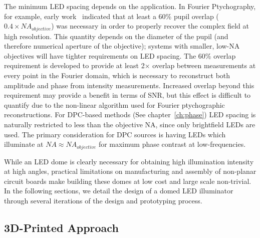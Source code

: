 The minimum LED spacing depends on the application. In Fourier Ptychography, for example, early work~\cite{Zheng2013, Tian14, Guo:15} indicated that at least a 60\% pupil overlap ($0.4 \times NA_{objective}$) was necessary in order to properly recover the complex field at high resolution. This quantity depends on the diameter of the pupil (and therefore numerical aperture of the objective); systems with smaller, low-NA objectives will have tighter requirements on LED spacing. The 60\% overlap requirement is developed to provide at least 2$\times$ overlap between measurements at every point in the Fourier domain, which is necessary to reconstruct both amplitude and phase from intensity measurements. Increased overlap beyond this requirement may provide a benefit in terms of SNR, but this effect is difficult to quantify due to the non-linear algorithm used for Fourier ptychographic reconstructions. For DPC-based methods (See chapter~\ref{ch:phase}) LED spacing is naturally restricted to less than the objective NA, since only brightfield LEDs are used. The primary consideration for DPC sources is having LEDs which illuminate at $NA \approx NA_{objective}$ for maximum phase contrast at low-frequencies.

While an LED dome is clearly necessary for obtaining high illumination intensity at high angles, practical limitations on manufacturing and assembly of non-planar circuit boards make building these domes at low cost and large scale non-trivial. In the following sections, we detail the design of a domed LED illuminator through several iterations of the design and prototyping process.

\subsection{3D-Printed Approach}\label{sec:fabrication:ccsdome}

